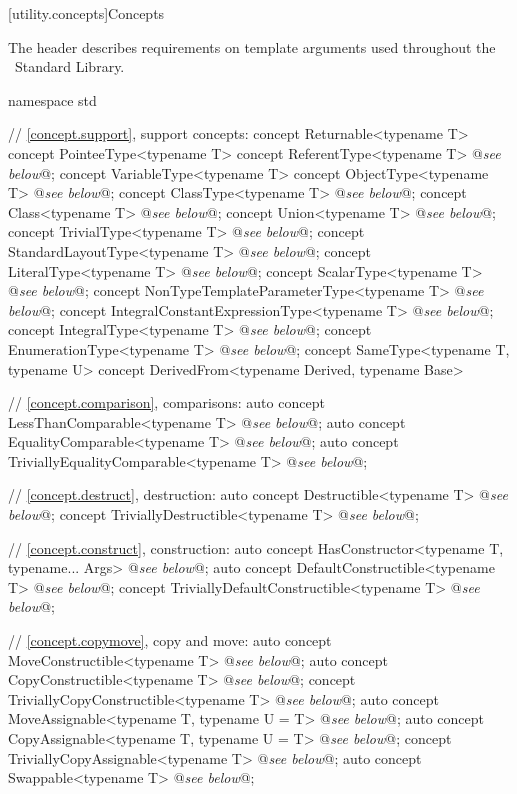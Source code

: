 \documentclass[american,twoside]{book}
\begin{document}
\noindent{}

\color{addclr}
[utility.concepts]{Concepts}

\pnum The  header describes requirements on template
arguments used throughout the \Cpp\ Standard Library.

\begin{codeblock}
namespace std {
  // \ref{concept.support}, support concepts:
  concept Returnable<typename T> { }
  concept PointeeType<typename T> { }
  concept ReferentType<typename T> @\textit{see below}@;
  concept VariableType<typename T> { }
  concept ObjectType<typename T> @\textit{see below}@;
  concept ClassType<typename T> @\textit{see below}@;
  concept Class<typename T> @\textit{see below}@;
  concept Union<typename T> @\textit{see below}@;
  concept TrivialType<typename T> @\textit{see below}@;
  concept StandardLayoutType<typename T> @\textit{see below}@;
  concept LiteralType<typename T> @\textit{see below}@;
  concept ScalarType<typename T> @\textit{see below}@;
  concept NonTypeTemplateParameterType<typename T> @\textit{see below}@;
  concept IntegralConstantExpressionType<typename T> @\textit{see below}@;
  concept IntegralType<typename T> @\textit{see below}@;
  concept EnumerationType<typename T> @\textit{see below}@;
  concept SameType<typename T, typename U> {  }
  concept DerivedFrom<typename Derived, typename Base> { }

  // \ref{concept.comparison}, comparisons:
  auto concept LessThanComparable<typename T> @\textit{see below}@;
  auto concept EqualityComparable<typename T> @\textit{see below}@;
  auto concept TriviallyEqualityComparable<typename T> @\textit{see below}@;

  // \ref{concept.destruct}, destruction:
  auto concept Destructible<typename T> @\textit{see below}@;
  concept TriviallyDestructible<typename T> @\textit{see below}@;

  // \ref{concept.construct}, construction:
  auto concept HasConstructor<typename T, typename... Args> @\textit{see below}@;
  auto concept DefaultConstructible<typename T> @\textit{see below}@;
  concept TriviallyDefaultConstructible<typename T> @\textit{see below}@;

  // \ref{concept.copymove}, copy and move:
  auto concept MoveConstructible<typename T> @\textit{see below}@;
  auto concept CopyConstructible<typename T> @\textit{see below}@;
  concept TriviallyCopyConstructible<typename T> @\textit{see below}@;
  auto concept MoveAssignable<typename T, typename U = T> @\textit{see below}@;
  auto concept CopyAssignable<typename T, typename U = T> @\textit{see below}@;
  concept TriviallyCopyAssignable<typename T> @\textit{see below}@;
  auto concept Swappable<typename T> @\textit{see below}@;

}
\end{codeblock}
\end{document}

